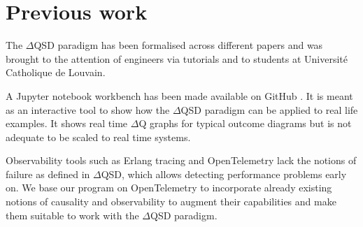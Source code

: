 \section{Previous work}
    The $\Delta$QSD paradigm has been formalised across different papers \cite{art} \cite{myo} and was brought to the attention of engineers via tutorials \cite{dq-tut} and to students at Université Catholique de Louvain. \cite{dq-ucl} 
    
    A Jupyter notebook workbench has been made available on GitHub \cite{dqsd-wkb}. It is meant as an interactive tool to show how the $\Delta$QSD paradigm can be applied to real life examples. It shows real time $\Delta$Q graphs for typical outcome diagrams but is not adequate to be scaled to real time systems.
    
    Observability tools such as Erlang tracing \cite{erl-t} and OpenTelemetry \cite{otel-e} lack the notions of failure as defined in $\Delta$QSD, which allows detecting performance problems early on. We base our program on OpenTelemetry to incorporate already existing notions of causality and observability to augment their capabilities and make them suitable to work with the $\Delta$QSD paradigm.
